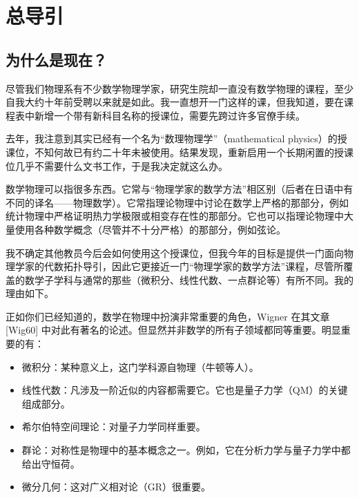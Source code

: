 \chapter{总导引}

\section{为什么是现在？}

尽管我们物理系有不少数学物理学家，研究生院却一直没有数学物理的课程，至少自我大约十年前受聘以来就是如此。我一直想开一门这样的课，但我知道，要在课程表中新增一个带有新科目名称的授课位，需要先跨过许多官僚手续。

去年，我注意到其实已经有一个名为“数理物理学”（mathematical physics）的授课位，不知何故已有约二十年未被使用。结果发现，重新启用一个长期闲置的授课位几乎不需要什么文书工作，于是我决定就这么办。

数学物理可以指很多东西。它常与“物理学家的数学方法”相区别（后者在日语中有不同的译名——物理数学）。它常指理论物理中讨论在数学上严格的那部分，例如统计物理中严格证明热力学极限或相变存在性的那部分。它也可以指理论物理中大量使用各种数学概念（尽管并不十分严格）的那部分，例如弦论。

我不确定其他教员今后会如何使用这个授课位，但我今年的目标是提供一门面向物理学家的代数拓扑导引，因此它更接近一门“物理学家的数学方法”课程，尽管所覆盖的数学子学科与通常的那些（微积分、线性代数、一点群论等）有所不同。我的理由如下。

正如你们已经知道的，数学在物理中扮演非常重要的角色，Wigner 在其文章 [Wig60] 中对此有著名的论述。但显然并非数学的所有子领域都同等重要。明显重要的有：

\begin{itemize}
  \item 微积分：某种意义上，这门学科源自物理（牛顿等人）。
  \item 线性代数：凡涉及一阶近似的内容都需要它。它也是量子力学（QM）的关键组成部分。
  \item 希尔伯特空间理论：对量子力学同样重要。
  \item 群论：对称性是物理中的基本概念之一。例如，它在分析力学与量子力学中都给出守恒荷。
  \item 微分几何：这对广义相对论（GR）很重要。
\end{itemize}

